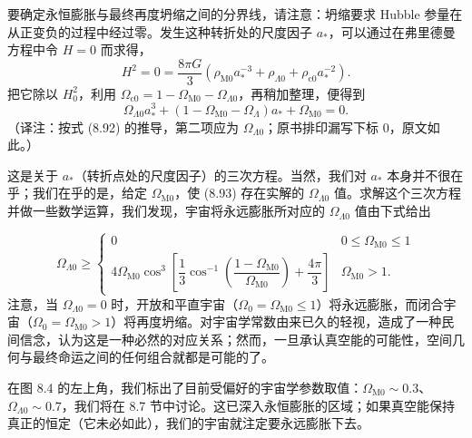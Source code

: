 要确定永恒膨胀与最终再度坍缩之间的分界线，请注意：坍缩要求 Hubble 参量在从正变负的过程中经过零。发生这种转折处的尺度因子 $a_{*}$，可以通过在弗里德曼方程中令 $H=0$ 而求得，
\begin{equation*}
H^{2} = 0 = \frac{8\pi G}{3}\left(\rho_{\mathrm{M}0}a_{*}^{-3} + \rho_{\Lambda0} + \rho_{\mathrm{c}0}a_{*}^{-2}\right).
\tag{8.92}
\end{equation*}
把它除以 $H_0^{2}$，利用 $\Omega_{\mathrm{c}0}=1-\Omega_{\mathrm{M}0}-\Omega_{\Lambda0}$，再稍加整理，便得到
\begin{equation*}
\Omega_{\Lambda0}a_{*}^{3} + (1-\Omega_{\mathrm{M}0}-\Omega_{\Lambda})a_{*} + \Omega_{\mathrm{M}0} = 0.
\tag{8.93}
\end{equation*}
（译注：按式 (8.92) 的推导，第二项应为 $\Omega_{\Lambda0}$；原书排印漏写下标 0，原文如此。）

这是关于 $a_{*}$（转折点处的尺度因子）的三次方程。当然，我们对 $a_{*}$ 本身并不很在乎；我们在乎的是，给定 $\Omega_{\mathrm{M}0}$，使 (8.93) 存在实解的 $\Omega_{\Lambda0}$ 值。求解这个三次方程并做一些数学运算，我们发现，宇宙将永远膨胀所对应的 $\Omega_{\Lambda0}$ 值由下式给出


\begin{equation*}
\Omega_{\Lambda0} \ge
\left\{
\begin{array}{ll}
0 & 0\le\Omega_{\mathrm{M}0}\le1 \\
4\Omega_{\mathrm{M}0}\cos^{3}\left[\dfrac{1}{3}\cos^{-1}\left(\dfrac{1-\Omega_{\mathrm{M}0}}{\Omega_{\mathrm{M}0}}\right) + \dfrac{4\pi}{3}\right] & \Omega_{\mathrm{M}0}>1.
\end{array}
\right.
\tag{8.94}
\end{equation*}
注意，当 $\Omega_{\Lambda0}=0$ 时，开放和平直宇宙（$\Omega_0=\Omega_{\mathrm{M}0}\le1$）将永远膨胀，而闭合宇宙（$\Omega_0=\Omega_{\mathrm{M}0}>1$）将再度坍缩。对宇宙学常数由来已久的轻视，造成了一种民间信念，认为这是一种必然的对应关系；然而，一旦承认真空能的可能性，空间几何与最终命运之间的任何组合就都是可能的了。

在图 8.4 的左上角，我们标出了目前受偏好的宇宙学参数取值：$\Omega_{\mathrm{M}0}\sim0.3$、$\Omega_{\Lambda0}\sim0.7$，我们将在 8.7 节中讨论。这已深入永恒膨胀的区域；如果真空能保持真正的恒定（它未必如此），我们的宇宙就注定要永远膨胀下去。

